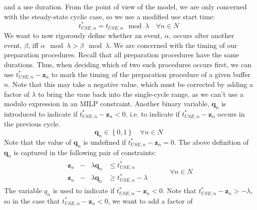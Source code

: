 and a use duration.
From the point of view of the model, we are only concerned with the
steady-state cyclic case, so we use a modified use start time:
\begin{equation}
    t_{USE,n}^{*} = t_{USE,n} \mod \lambda \quad \forall n \in N
\end{equation}
We want to now rigorously define whether an event, $\alpha$, occurs after
another event, $\beta$, iff $ \alpha \mod \lambda > \beta \mod \lambda $.
We are concerned with the timing of our preparation procedures.
Recall that all preparation procedures have the same durations.
Thus, when deciding which of two such procedures occurs first, we can use
$ t_{USE,n}^{*} - \boldsymbol{z}_{n} $ to mark the timing of the
preparation procedure of a given buffer $n$.
Note that this may take a negative value, which must be corrected by adding a
factor of $\lambda$ to bring the vaue back into the single-cycle range, as we
can't use a modulo expression in an MILP constraint.
Another binary variable, $ \boldsymbol{q}_{n} $ is introduced to indicate if
$ t_{USE,n}^{*} - \boldsymbol{z}_{n} < 0 $, i.e. to indicate if 
$ t_{USE,n}^{*} - \boldsymbol{z}_{n}$ occurs in the previous cycle.
\begin{equation}
    \boldsymbol{q}_{n} \in \left\{ 0, 1 \right\} \quad \forall n \in N
    \label{eq.q}
\end{equation}
Note that the value of $ \boldsymbol{q}_{n} $ is undefined if
$ t_{USE,n}^{*} - \boldsymbol{z}_{n} = 0 $.
The above definition of $ \boldsymbol{q}_{n} $ is captured in the following
pair of constraints:
\begin{equation}
    \begin{split}
        \begin{alignedat}{2}
            \boldsymbol{z}_{n} & {}-{} & \lambda \boldsymbol{q}_{n} & \le
            t_{USE,n}^{*}\\
            \boldsymbol{z}_{n} & {}-{} & \lambda \boldsymbol{q}_{n} & \ge
            t_{USE,n}^{*} - \lambda
        \end{alignedat}
    \end{split}
    \quad\quad
    \begin{split}
        \forall n \in N
    \end{split}
    \label{eq.constr8a}
\end{equation}
The variable $q_{n}$ is used to indicate if
$ t_{USE,n}^{*} - \boldsymbol{z}_{n} < 0 $.
Note that $t_{USE,n}^{*} - \boldsymbol{z}_{n} > -\lambda$, so in the case that
$ t_{USE,n}^{*} - \boldsymbol{z}_{n} < 0 $, we want to add a factor of
